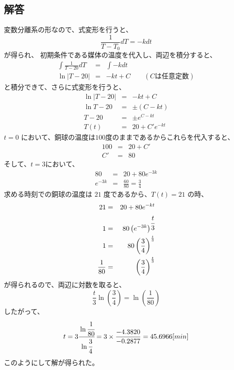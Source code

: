 \documentclass[dvipdfmx,uplatex]{jsarticle}
\begin{document}
\begin{spacing}{1.6}
\begin{qparts}
  \subsection*{解答}
  変数分離系の形なので、式変形を行うと、
  \begin{equation*}
    \frac{1}{T - T_0}dT = -kdt
  \end{equation*}
  が得られ、  初期条件である媒体の温度を代入し、両辺を積分すると、
  \begin{eqnarray*}
        \int \frac{1}{T - 20}dT & = & \int -kdt \\
        \ln |T - 20| & = & -kt + C \qquad (Cは任意定数)
  \end{eqnarray*}
  と積分できて、さらに式変形を行うと、\\
  \begin{eqnarray*}
        \ln |T - 20| & = & -kt + C \\
        \ln T - 20 & = & \pm (C - kt) \\
        T - 20 & = & \pm e ^ {C - kt} \\
        T(t) & = & 20 + C'e ^ {-kt}
  \end{eqnarray*}
  $ t = 0 $ において、銅球の温度は$100$度のままであるからこれらを代入すると、
  \begin{eqnarray*}
    100 & = & 20 + C' \\
    C' & = & 80
  \end{eqnarray*}
  そして、$ t = 3 $において、
  \begin{eqnarray*}
    80 & = & 20 + 80 e ^ {-3k} \\
    e ^ {-3k} & = & \frac{60}{80} = \frac{3}{4}
  \end{eqnarray*}
  求める時刻での銅球の温度は $ 21 $ 度であるから、$ T(t) = 21 $ の時、
  \begin{eqnarray*}
    21 & = & 20 + 80e ^ {-kt}\\
    1 & = & 80 \left(e ^ {-3k} \right) ^ { \cfrac{t}{3}} \\
    1 & = & 80 \left( \frac{3}{4} \right) ^ {\frac{t}{3}} \\
    \frac{1}{80} & = & \left( \frac{3}{4} \right) ^ {\frac{t}{3}}
  \end{eqnarray*}
  が得られるので、両辺に対数を取ると、
  \begin{equation*}
    \frac{t}{3} \ln \left(\frac{3}{4}\right) = \ln \left(\frac{1}{80}\right)
  \end{equation*}
  したがって、
  \begin{equation*}
    t = 3 \cfrac{\ln \cfrac{1}{80}}{\ln \cfrac{3}{4}} = 3 \times \frac{-4.3820}{-0.2877} = 45.6966[min]
  \end{equation*}
  このようにして解が得られた。


\end{qparts}
\end{spacing}
\end{document}
